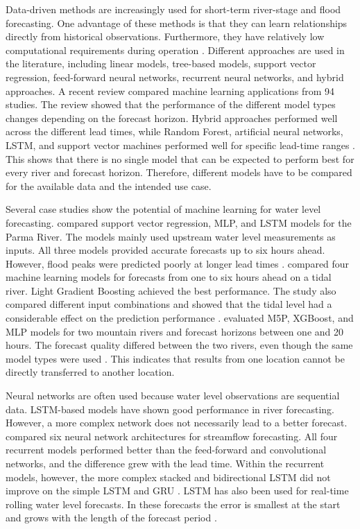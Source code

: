 Data-driven methods are increasingly used for short-term river-stage and flood forecasting. One advantage of these methods is that they can learn relationships directly from historical observations. Furthermore, they have relatively low computational requirements during operation \cite{dazziFloodStageForecasting2021}. Different approaches are used in the literature, including linear models, tree-based models, support vector regression, feed-forward neural networks, recurrent neural networks, and hybrid approaches. A recent review compared machine learning applications from 94 studies. The review showed that the performance of the different model types changes depending on the forecast horizon. Hybrid approaches performed well across the different lead times, while Random Forest, artificial neural networks, \ac{LSTM}, and support vector machines performed well for specific lead-time ranges \cite{asifReviewIntercomparisonMachine2025}. This shows that there is no single model that can be expected to perform best for every river and forecast horizon. Therefore, different models have to be compared for the available data and the intended use case.

Several case studies show the potential of machine learning for water level forecasting. \citeauthor{dazziFloodStageForecasting2021} compared support vector regression, \ac{MLP}, and \ac{LSTM} models for the Parma River. The models mainly used upstream water level measurements as inputs. All three models provided accurate forecasts up to six hours ahead. However, flood peaks were predicted poorly at longer lead times \cite{dazziFloodStageForecasting2021}. \citeauthor{guoPredictionRiverStage2021} compared four machine learning models for forecasts from one to six hours ahead on a tidal river. Light Gradient Boosting achieved the best performance. The study also compared different input combinations and showed that the tidal level had a considerable effect on the prediction performance \cite{guoPredictionRiverStage2021}. \citeauthor{belyakovaForecastingWaterLevels2022} evaluated M5P, XGBoost, and \ac{MLP} models for two mountain rivers and forecast horizons between one and 20 hours. The forecast quality differed between the two rivers, even though the same model types were used \cite{belyakovaForecastingWaterLevels2022}. This indicates that results from one location cannot be directly transferred to another location.

Neural networks are often used because water level observations are sequential data. \ac{LSTM}-based models have shown good performance in river forecasting. However, a more complex network does not necessarily lead to a better forecast. \citeauthor{leComparisonDeepLearning2021} compared six neural network architectures for streamflow forecasting. All four recurrent models performed better than the feed-forward and convolutional networks, and the difference grew with the lead time. Within the recurrent models, however, the more complex stacked and bidirectional \ac{LSTM} did not improve on the simple \ac{LSTM} and \ac{GRU} \cite{leComparisonDeepLearning2021}. \ac{LSTM} has also been used for real-time rolling water level forecasts. In these forecasts the error is smallest at the start and grows with the length of the forecast period \cite{liuShortTermRealTime2021}.

